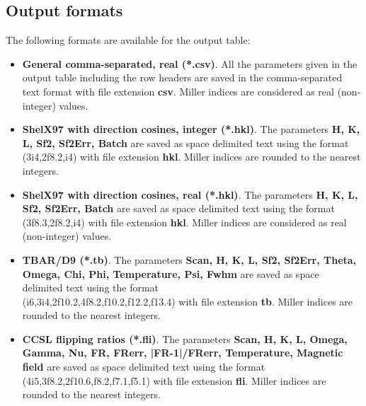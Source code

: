 \newpage
\subsection{Output formats}

The following formats are available for the output table:

\begin{itemize}
	\item \textbf{General comma-separated, real (*.csv)}. All the parameters given in the output table including the row headers are saved in the comma-separated text format with file extension \textbf{csv}. Miller indices are considered as real (non-integer) values.
	\item \textbf{ShelX97 with direction cosines, integer (*.hkl)}. The parameters \textbf{H, K, L, Sf2, Sf2Err, Batch} are saved as space delimited text using the format (3i4,2f8.2,i4) with file extension \textbf{hkl}. Miller indices are rounded to the nearest integers.
	\item \textbf{ShelX97 with direction cosines, real (*.hkl)}. The parameters \textbf{H, K, L, Sf2, Sf2Err, Batch} are saved as space delimited text using the format (3f8.3,2f8.2,i4) with file extension \textbf{hkl}. Miller indices are considered as real (non-integer) values.
	\item \textbf{TBAR/D9 (*.tb)}. The parameters \textbf{Scan, H, K, L, Sf2, Sf2Err, Theta, Omega, Chi, Phi, Temperature, Psi, Fwhm} are saved as space delimited text using the format\\ (i6,3i4,2f10.2,4f8.2,f10.2,f12.2,f13.4) with file extension \textbf{tb}. Miller indices are rounded to the nearest integers.
	\item \textbf{CCSL flipping ratios (*.fli)}. The parameters \textbf{Scan, H, K, L, Omega, Gamma, Nu, FR, FRerr, |FR-1|/FRerr, Temperature, Magnetic field} are saved as space delimited text using the format (4i5,3f8.2,2f10.6,f8.2,f7.1,f5.1) with file extension \textbf{fli}.  Miller indices are rounded to the nearest integers.
\end{itemize}



